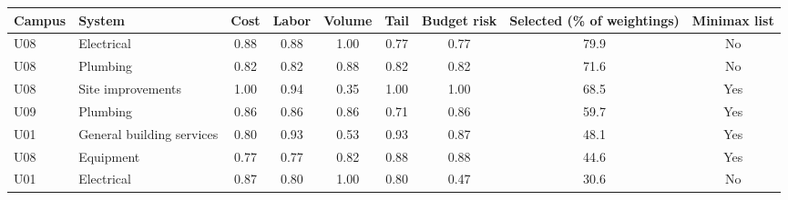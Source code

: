 \begin{tabular}{llccccccc}
\toprule
Campus & System & Cost & Labor & Volume & Tail & Budget risk & Selected (\% of weightings) & Minimax list \\
\midrule
U08 & Electrical & 0.88 & 0.88 & 1.00 & 0.77 & 0.77 & 79.9 & No \\
U08 & Plumbing & 0.82 & 0.82 & 0.88 & 0.82 & 0.82 & 71.6 & No \\
U08 & Site improvements & 1.00 & 0.94 & 0.35 & 1.00 & 1.00 & 68.5 & Yes \\
U09 & Plumbing & 0.86 & 0.86 & 0.86 & 0.71 & 0.86 & 59.7 & Yes \\
U01 & General building services & 0.80 & 0.93 & 0.53 & 0.93 & 0.87 & 48.1 & Yes \\
U08 & Equipment & 0.77 & 0.77 & 0.82 & 0.88 & 0.88 & 44.6 & Yes \\
U01 & Electrical & 0.87 & 0.80 & 1.00 & 0.80 & 0.47 & 30.6 & No \\
\bottomrule
\end{tabular}
